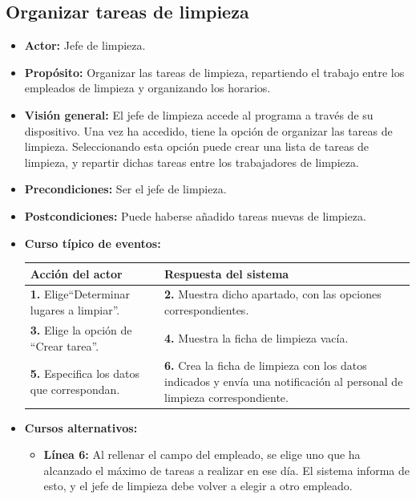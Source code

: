 \documentclass[spanish,a4paper,11pt, twoside]{report}	%
\begin{document}
	\subsection{Organizar tareas de limpieza}
			\begin{itemize}
			\item \textbf{Actor: }Jefe de limpieza.
			\item \textbf{Propósito: }Organizar las tareas de limpieza, repartiendo el
				trabajo entre los empleados de limpieza y organizando los horarios.
			\item \textbf{Visión general: }El jefe de limpieza accede al programa a través
				de su dispositivo. Una vez ha accedido, tiene la opción de organizar las tareas de limpieza. 
				Seleccionando esta opción puede crear una lista de tareas de limpieza, y repartir dichas tareas
				entre los trabajadores de limpieza.
			\item \textbf{Precondiciones:} Ser el jefe de limpieza.
			\item \textbf{Postcondiciones:} Puede haberse añadido tareas nuevas de limpieza.
			\item \textbf{Curso típico de eventos:} \\
			\begin{tabular}{|p{6cm}||p{6cm}|}
				\hline
				\textbf{Acción del actor} & \textbf{Respuesta del sistema} \\ \hline \hline
				\textbf{1.} Elige``Determinar lugares a limpiar''. & 
				\textbf{2.} Muestra dicho apartado, con las opciones correspondientes. \\ \hline
				\textbf{3.} Elige la opción de ``Crear tarea''.	& 
				\textbf{4.} Muestra la ficha de limpieza vacía. \\ \hline
				\textbf{5.} Especifica los datos que correspondan. & 
				\textbf{6.} Crea la ficha de limpieza con los datos indicados y 
					envía una notificación al personal de limpieza correspondiente. \\ \hline
			\end{tabular}

			\item \textbf{Cursos alternativos:} 
				\begin {itemize}
					
					\item \textbf{Línea 6: } Al rellenar el campo del empleado, se elige uno 
					que ha alcanzado el máximo de tareas a realizar en ese día. 
					El sistema informa de esto, y el jefe de limpieza debe volver a elegir a otro empleado.
				\end {itemize}
			\end{itemize}%
\end{document}

